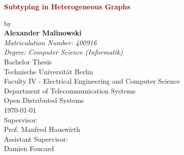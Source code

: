 \begin{titlepage}
	\begin{figure}[H]
	\centering
	\vspace*{-1.22cm}
	\hfill
	\end{figure}
	\hfill
	\begin{center}
	\vspace{1cm}
		\Huge
		\begin{spacing}{.9}
			\textcolor{DarkRed}{\textbf{Subtyping in Heterogeneous Graphs}}\\
		\end{spacing}
		\vspace{0.8cm}
		\large
		by\\
		\vspace{0.8cm} 
		\textbf{Alexander Malinowski}\\
		\vspace{0.8cm} 
		\emph{Matriculation Number: 400916}\\
		\emph{{Degree:} Computer Science (Informatik)}\\
		\vspace{1cm} 
	 	Bachelor Thesis \\
		\vspace{0.5cm}
		Technische Universität Berlin\\
		Faculty IV - Electrical Engineering and Computer Science\\
		Department of Telecommunication Systems\\
		Open Distributed Systems\\
		\vspace{1.0cm}
		\today\\
		\vspace{1.0cm}
		\large
		Supervisor:\\
		Prof. Manfred Hauswirth\\
		\vspace{1cm}
		Assistant Supervisor:\\
		Damien Foucard
		\end{center}
\end{titlepage}
